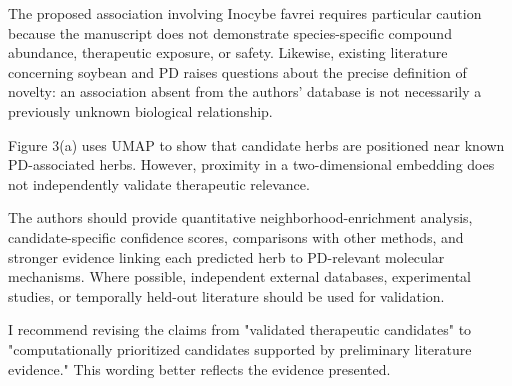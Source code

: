 \documentclass[11pt,american]{article}
\begin{document}
\begin{revcomment}
The proposed association involving Inocybe favrei requires particular caution because the manuscript does not demonstrate species-specific compound abundance, therapeutic exposure, or safety. Likewise, existing literature concerning soybean and PD raises questions about the precise definition of novelty: an association absent from the authors' database is not necessarily a previously unknown biological relationship.

Figure 3(a) uses UMAP to show that candidate herbs are positioned near known PD-associated herbs. However, proximity in a two-dimensional embedding does not independently validate therapeutic relevance.

The authors should provide quantitative neighborhood-enrichment analysis, candidate-specific confidence scores, comparisons with other methods, and stronger evidence linking each predicted herb to PD-relevant molecular mechanisms. Where possible, independent external databases, experimental studies, or temporally held-out literature should be used for validation.

I recommend revising the claims from "validated therapeutic candidates" to "computationally prioritized candidates supported by preliminary literature evidence." This wording better reflects the evidence presented.
\end{revcomment}

\begin{revresponse}

\end{revresponse}
\end{document}
